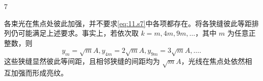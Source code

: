 \begin{solution}{7}
\begin{subsolution}
各束光在焦点处彼此加强，并不要求\eqref{eq:11.s7}中各项都存在。将各狭缝彼此等距排列仍可能满足上述要求。事实上，若依次取 $k = m, 4m, 9m, \dots$，其中 $m$ 为任意正整数，则
\begin{equation}
y_m = \sqrt{m}A, y_{4m} = 2\sqrt{m}A, y_{9m} = 3\sqrt{m}A, \dots .
\label{eq:12.s7}
\end{equation}
这些狭缝显然彼此等间距，且相邻狭缝的间距均为 $\sqrt{m}A$，光线在焦点处依然相互加强而形成亮纹。
\end{subsolution}
\end{solution}